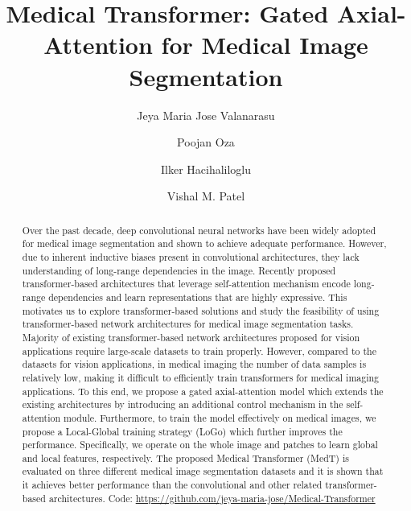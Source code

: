 \documentclass[runningheads]{llncs}
\begin{document}
\title{Medical Transformer: Gated Axial-Attention for Medical Image Segmentation }
\author{Jeya Maria Jose Valanarasu \and 
		Poojan Oza \and
		Ilker Hacihaliloglu \and
		Vishal M. Patel
	}
\maketitle              \begin{abstract}


		Over the past decade, deep convolutional neural networks have been widely adopted for medical image segmentation and shown to achieve adequate performance. However, due to inherent inductive biases present in convolutional architectures, they lack understanding of long-range dependencies in the image. Recently proposed transformer-based architectures that leverage self-attention mechanism  encode long-range dependencies and learn representations that are highly expressive. This motivates us to explore transformer-based solutions and study the feasibility of using transformer-based network architectures for medical image segmentation tasks. Majority of existing transformer-based network architectures proposed for vision applications  require large-scale datasets to train properly. However, compared to the datasets for vision applications, in medical imaging the number of data samples is relatively low, making it difficult to efficiently train transformers for medical imaging  applications. To this end, we propose a gated axial-attention model which extends the existing architectures by introducing an additional control mechanism in the self-attention module. Furthermore, to train the model effectively on medical images, we propose a Local-Global training strategy (LoGo) which further improves the performance. Specifically, we operate on the whole image and patches to learn global and local features, respectively. The proposed Medical Transformer (MedT) is evaluated on three different medical image segmentation datasets and it is shown that it achieves better performance than the convolutional and other related transformer-based architectures. Code: \href{https://github.com/jeya-maria-jose/Medical-Transformer}{https://github.com/jeya-maria-jose/Medical-Transformer}
		
	\end{abstract}
\end{document}
